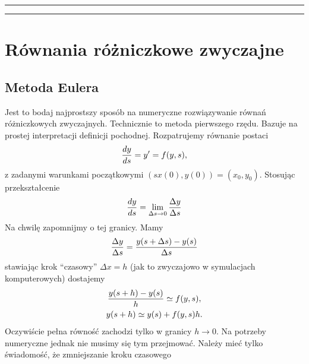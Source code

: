 \documentclass[a4paper,12pt,polish]{sphinxmanual}
\begin{document}
\bigskip\hrule{}\bigskip



\bigskip\hrule{}\bigskip



\section{Równania różniczkowe zwyczajne}
\label{ch5/chV012:python}\label{ch5/chV012::doc}\label{ch5/chV012:rownania-rozniczkowe-zwyczajne}

\subsection{Metoda Eulera}
\label{ch5/chV012:metoda-eulera}
Jest to bodaj najprostszy sposób na numeryczne rozwiązywanie równań różniczkowych
zwyczajnych. Technicznie to metoda pierwszego rzędu. Bazuje na prostej interpretacji
definicji pochodnej. Rozpatrujemy równanie postaci
\begin{gather}
\begin{split}\frac{dy}{ds} = y' = f(y,s),\end{split}\notag
\end{gather}
z zadanymi warunkami początkowymi $(sx(0), y(0)) = (x_0, y_0)$. Stosując przekształcenie
\begin{gather}
\begin{split}\frac{dy}{ds} = \lim_{\Delta s \to 0}\frac{\Delta y}{\Delta s}\end{split}\notag
\end{gather}
Na chwilę zapomnijmy o tej granicy. Mamy
\begin{gather}
\begin{split}\frac{\Delta y}{\Delta s} = \frac{y(s+\Delta s) - y(s)}{\Delta s}\end{split}\notag
\end{gather}
stawiając krok ``czasowy'' $\Delta x = h$ (jak to zwyczajowo w symulacjach komputerowych)
dostajemy
\begin{gather}
\begin{split}\frac{y(s + h) - y(s)}{h} \simeq f(y,s),\end{split}\notag\\\begin{split}y(s+h) \simeq y(s) + f(y,s) h.\end{split}\notag
\end{gather}
Oczywiście pełna równość zachodzi tylko w granicy $h \to 0$. Na potrzeby numeryczne jednak
nie musimy się tym przejmować. Należy mieć tylko świadomość, że zmniejszanie kroku czasowego
\end{document}
